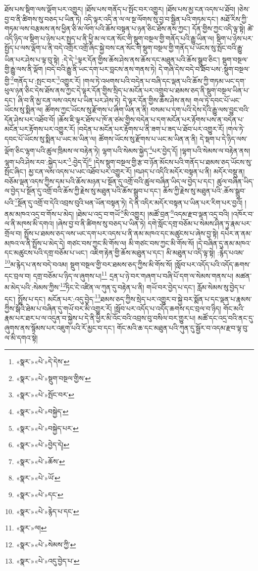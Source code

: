 ཐོས་པས་སྡིག་ལས་ལྡོག་པར་འགྱུར། །ཐོས་པས་གནོད་པ་སྤོང་བར་འགྱུར། །ཐོས་པས་མྱ་ངན་འདས་པ་ཐོབ། །ཅེས་བྱ་བ་ནི་ཚིགས་སུ་བཅད་པ་ཡིན་ཏེ། འདི་ལྟར་འདི་ན་ལ་ལ་སྔ་ལོགས་སུ་བྱ་བ་སྦྱིན་པའི་གཏམ་དང་། མཐོ་རིས་ཀྱི་གཏམ་ལས་བརྩམས་ནས་ཕྱིན་ཅི་མ་ལོག་པའི་ཆོས་བསྟན་པ་ཉན་ཅིང་ཐོས་ནས་ཀྱང་། དོན་གྱིས་ཀྱང་འདི་ལྟ་སྟེ། ཚེ་འདི་ཉིད་ལ་སྡིག་པ་ཉེས་པར་སྤྱད་པ་ནི་ཕྱི་མ་ལ་ངན་སོང་གི་སྡུག་བསྔལ་གྱི་གནོད་པའི་རྒྱུ་ཡིན་ལ། སྡིག་པ་ཉེས་པར་སྤྱོད་པ་ལས་ལྡོག་པ་ནི་བདེ་འགྲོར་འགྲོ་ཞིང་སྐྱེ་བས་ངན་སོང་གི་སྡུག་བསྔལ་གྱི་གནོད་པ་ཡོངས་སུ་སྤོང་བའི་རྒྱུ་ཡིན་པར་ཤེས་པ་ལྟ་བུ་སྟེ། :དེ་དེ་\footnote{«སྣར་»«པེ་»དེ་དེས་}ལྟར་དོན་གྱིས་ཆོས་ཤེས་ནས་ཆོས་དང་མཐུན་པའི་ཆོས་སྒྲུབ་ཅིང་། སྡུག་བསྔལ་གྱི་རྒྱུ་ལས་ནི་ལྡོག །བདེ་བའི་རྒྱུ་ནི་ཡང་དག་པར་བླངས་ནས་གནས་ཏེ། དེ་གཞི་དེས་བདེ་བ་ཐོབ་པས་:སྡུག་བསྔལ་གྱི་\footnote{«སྣར་»«པེ་»སྡུག་བསྔལ་གྱིས་}གནོད་པ་:སྤང་བར་\footnote{«སྣར་»«པེ་»སྤོང་བར་}འགྱུར་རོ། །གལ་ཏེ་འཕགས་པའི་བདེན་པ་བཞི་དང་ལྡན་པའི་ཆོས་ཀྱི་གཏམ་ཡང་དག་ཕུལ་ཉན་ཅིང་དེས་ཐོས་ནས་ཀྱང་དེ་ལྟར་དོན་གྱིས་སྲིད་པ་མངོན་པར་འགྲུབ་པ་ཐམས་ཅད་ནི་སྡུག་བསྔལ་ཡིན་པ་དང་། ཞི་བ་ནི་མྱ་ངན་ལས་འདས་པ་ཡིན་པར་ཤེས་ཏེ། དེ་ལྟར་དོན་གྱིས་ཆོས་ཤེས་ནས། གལ་ཏེ་དབང་པོ་ཡང་ཡོངས་སུ་སྨིན་ལ། ཚོགས་ཀྱང་ཡོངས་སུ་རྫོགས་པ་ཞིག་ཡིན་ན་ནི། བསམ་པ་དག་པའི་དེས་དེའི་རྒྱུ་ལས་བྱུང་བའི་དོན་ཤེས་པར་འཐོབ་བོ། །ཆོས་ཇི་ལྟར་ཐོས་པ་ཁོ་ན་ཙམ་གྱིས་བདེན་པ་དག་མངོན་པར་རྟོགས་པས་ན་བདེན་པ་མངོན་པར་རྟོགས་པར་འགྱུར་རོ། །བདེན་པ་མངོན་པར་རྟོགས་པ་ནི་ཟག་པ་ཟད་པ་ཐོབ་པར་འགྱུར་རོ། །གལ་ཏེ་དབང་པོ་ཡོངས་སུ་སྨིན་པ་ཡང་མ་ཡིན་ལ། ཚོགས་ཡོངས་སུ་རྫོགས་པ་ཡང་མ་ཡིན་ན་ནི། དེ་སྡག་པ་དེ་ཉིད་ལས་ལྡོག་ཅིང་ལྷག་པའི་ཚུལ་ཁྲིམས་ལ་བརྟེན་ཏེ། ལྷག་པའི་སེམས་སྐྱེད་\footnote{«སྣར་»«པེ་»བསྐྱེད་}པར་བྱེད་དོ། །ལྷག་པའི་སེམས་ལ་བརྟེན་ནས། ལྷག་པའི་ཤེས་རབ་:སྐྱེད་པར་\footnote{«སྣར་»«པེ་»བསྐྱེད་པར་}:བྱེད་དོ།\footnote{«སྣར་»«པེ་»བྱེད་དེ།} །དེས་སྡུག་བསྔལ་གྱི་རྩ་བ་ཉོན་མོངས་པའི་གནོད་པ་ཐམས་ཅད་ཡོངས་སུ་སྤོང་ཞིང་། མྱ་ངན་ལས་འདས་པ་ཡང་འཐོབ་པར་འགྱུར་རོ། །བཤད་པ་འདིའི་མདོར་བསྟན་པ་ནི། མདོར་བསྡུ་ན། བཅོམ་ལྡན་འདས་ཀྱིས་དམ་པའི་ཆོས་མཉན་པ་སྔོན་དུ་འགྲོ་བའི་ཚུལ་བཞིན་ཡིད་ལ་བྱེད་པ་དང་། ཚུལ་བཞིན་ཡིད་ལ་བྱེད་པ་སྔོན་དུ་འགྲོ་བའི་ཆོས་ཀྱི་རྗེས་སུ་མཐུན་པའི་ཆོས་སྒྲུབ་པ་དང་། ཆོས་ཀྱི་རྗེས་སུ་མཐུན་པའི་:ཆོས་སྒྲུབ་པའི་\footnote{«སྣར་»«པེ་»ཆོས་}སྔོན་དུ་འགྲོ་བ་དེའི་འབྲས་བུའི་ཕན་ཡོན་བསྟན་ཏེ། དེ་ནི་འདིར་མདོར་བསྟན་པ་ཡིན་པར་རིག་པར་བྱའོ། །ནམ་མཁའ་འདྲ་བ་གོས་པ་མེད། །ཐེམ་པ་འདྲ་བ་གཡོ་\footnote{«སྣར་»«པེ་»ཡོ་}མི་འགྱུར། །མཚོ་བྲན་\footnote{«སྣར་»«པེ་»དང་}འདམ་རྫབ་ལྡན་འདྲ་བའི། །འཁོར་བ་ལ་ནི་མཁས་མི་དགའ། །ཞེས་བྱ་བ་ནི་ཚིགས་སུ་བཅད་པ་ཡིན་ཏེ། དགེ་སློང་དགྲ་བཅོམ་པ་སེམས་ཤིན་ཏུ་རྣམ་པར་གྲོལ་བ། སྤྲོས་པ་ཐམས་ཅད་ལས་ཡང་དག་པར་འདས་པ་ནི་ནམ་མཁའ་དང་མཚུངས་པ་ཞེས་བྱ་སྟེ། དཔེར་ན་ནམ་མཁའ་ལ་ནི་སྤྲོས་པ་མེད་དེ། གཙང་བས་ཀྱང་མི་གོས་ལ། མི་གཙང་བས་ཀྱང་མི་གོས་སོ། །དེ་བཞིན་དུ་ནམ་མཁའ་དང་མཚུངས་པའི་དགྲ་བཅོམ་པ་ཡང་། འཇིག་རྟེན་གྱི་ཆོས་མཐུན་པ་དང་། མི་མཐུན་པ་འདི་ལྟ་སྟེ། :རྙེད་པའམ་\footnote{«སྣར་»«པེ་»རྙེད་པ་དང་}མ་རྙེད་པ་ནས་བདེ་བའམ། སྡུག་བསྔལ་གྱི་བར་ཐམས་ཅད་ཀྱིས་མི་གོས་སོ། །སློབ་པར་འདོད་པའི་འདོད་ཆགས་དང་བྲལ་བ། དགྲ་བཅོམ་པ་ཉིད་ལ་ཞུགས་པ།\footnote{«སྣར་»ལ།} དྲན་པ་ཉེ་བར་གཞག་པ་བཞི་པོ་དག་ལ་སེམས་གནས་པ། མཚན་མ་མེད་པའི་:སེམས་ཀྱིས་\footnote{«སྣར་»«པེ་»སེམས་ཀྱི་}ཏིང་ངེ་འཛིན་ལ་ཀུན་དུ་བརྟེན་པ་ནི། གཡོ་བར་བྱེད་པ་དང་། རློམ་སེམས་སུ་བྱེད་པ་དང་། སྤྲོས་པ་དང་། མངོན་པར་:འདུ་བྱེད་\footnote{«སྣར་»«པེ་»འདུ་བྱེད་པ་}ཐམས་ཅད་ཀྱིས་སྲེད་པར་འགྱུར་བ་སྐྱེ་བར་སྨོན་པ་དང་ལྡན་པ་རྣམས་ཀྱིས་སྒོའི་ཐེམ་པ་བཞིན་དུ་གཡོ་བར་མི་འགྱུར་རོ། །སློབ་པར་འདོད་པ་འདོད་ཆགས་དང་བྲལ་བ་ཉིད། གོང་མའི་རྣམ་པར་ཐར་པ་ལ་འདུན་བ་སྐྱེས་པ་དེ་ནི་ཕྱིར་མི་འོང་བའི་འབྲས་བུ་བསིལ་བར་གྱུར་པ། མཚོ་དང་འདྲ་བའི་ནང་དུ་ཞུགས་ནས་སྙོམས་པར་འཇུག་པའི་རོ་མྱང་བ་དང་། གོང་མའི་ཆ་དང་མཐུན་པའི་ཀུན་དུ་སྦྱོར་བ་འདམ་རྫབ་ལྟ་བུ་ལ་མི་དགའ་སྟེ། 
